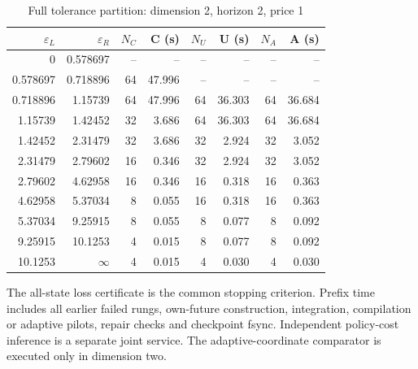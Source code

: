 \begin{table}[htbp]
\centering
\caption{Full tolerance partition: dimension 2, horizon 2, price 1}\label{tab:frontier-full48-2-2-1}
\footnotesize
\begin{tabular}{rrrrrrrr}
\toprule
$\varepsilon_L$ & $\varepsilon_R$ & $N_C$ & C (s) & $N_U$ & U (s) & $N_A$ & A (s)\\
\midrule
0 & 0.578697 & -- & -- & -- & -- & -- & -- \\
0.578697 & 0.718896 & 64 & 47.996 & -- & -- & -- & -- \\
0.718896 & 1.15739 & 64 & 47.996 & 64 & 36.303 & 64 & 36.684 \\
1.15739 & 1.42452 & 32 & 3.686 & 64 & 36.303 & 64 & 36.684 \\
1.42452 & 2.31479 & 32 & 3.686 & 32 & 2.924 & 32 & 3.052 \\
2.31479 & 2.79602 & 16 & 0.346 & 32 & 2.924 & 32 & 3.052 \\
2.79602 & 4.62958 & 16 & 0.346 & 16 & 0.318 & 16 & 0.363 \\
4.62958 & 5.37034 & 8 & 0.055 & 16 & 0.318 & 16 & 0.363 \\
5.37034 & 9.25915 & 8 & 0.055 & 8 & 0.077 & 8 & 0.092 \\
9.25915 & 10.1253 & 4 & 0.015 & 8 & 0.077 & 8 & 0.092 \\
10.1253 & $\infty$ & 4 & 0.015 & 4 & 0.030 & 4 & 0.030 \\
\bottomrule
\end{tabular}
\begin{minipage}{0.97\linewidth}\footnotesize\vspace{3pt}
The all-state loss certificate is the common stopping criterion. Prefix time includes all earlier failed rungs, own-future construction, integration, compilation or adaptive pilots, repair checks and checkpoint fsync. Independent policy-cost inference is a separate joint service. The adaptive-coordinate comparator is executed only in dimension two.
\end{minipage}
\end{table}
